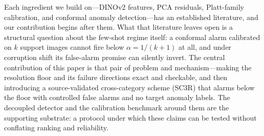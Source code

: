 Each ingredient we build on---DINOv2 features, PCA residuals, Platt-family calibration, and conformal anomaly detection---has an established literature, and our contribution begins after them. What that literature leaves open is a structural question about the few-shot regime itself: a conformal alarm calibrated on $k$ support images cannot fire below $\alpha=1/(k{+}1)$ at all, and under corruption shift its false-alarm promise can silently invert. The central contribution of this paper is that pair of problem and mechanism---making the resolution floor and its failure directions exact and checkable, and then introducing a source-validated cross-category scheme (SC3R) that alarms below the floor with controlled false alarms and no target anomaly labels. The decoupled detector and the calibration benchmark around them are the supporting substrate: a protocol under which these claims can be tested without conflating ranking and reliability.

